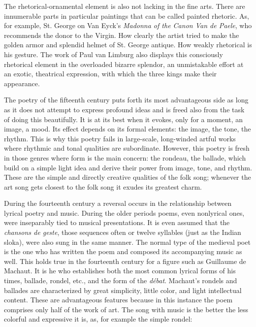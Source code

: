\protect\hypertarget{21_Chapter_Thirteen__IMAGE_AND_WORD.xhtmlux5cux23page_356}{}{}The
rhetorical-ornamental element is also not lacking in the fine arts.
There are innumerable parts in particular paintings that can be called
painted rhetoric. As, for example, St. George on Van Eyck's
\emph{Madonna of the Canon Van de Paele}, who recommends the donor to
the Virgin. How clearly the artist tried to make the golden armor and
splendid helmet of St. George antique. How weakly rhetorical is his
gesture. The work of Paul van Limburg also displays this consciously
rhetorical element in the overloaded bizarre splendor, an unmistakable
effort at an exotic, theatrical expression, with which the three kings
make their appearance.

The poetry of the fifteenth century puts forth its most advantageous
side as long as it does not attempt to express profound ideas and is
freed also from the task of doing this beautifully. It is at its best
when it evokes, only for a moment, an image, a mood. Its effect depends
on its formal elements: the image, the tone, the rhythm. This is why
this poetry fails in large-scale, long-winded artful works where
rhythmic and tonal qualities are subordinate. However, this poetry is
fresh in those genres where form is the main concern: the rondeau, the
ballade, which build on a simple light idea and derive their power from
image, tone, and rhythm. These are the simple and directly creative
qualities of the folk song; whenever the art song gets closest to the
folk song it exudes its greatest charm.

During the fourteenth century a reversal occurs in the relationship
between lyrical poetry and music. During the older periods poems, even
nonlyrical ones, were inseparably tied to musical presentations. It is
even assumed that the \emph{chansons de geste}, those sequences often or
twelve syllables (just as the Indian sloka), were also sung in the same
manner. The normal type of the medieval poet is the one who has written
the poem and composed its accompanying music as well. This holds true in
the fourteenth century for a figure such as Guillaume de Machaut. It is
he who establishes both the most common lyrical forms of his times,
ballade, rondel, etc., and the form of the \emph{débat}. Machaut's
rondels and ballades are characterized by great simplicity, little
color, and light intellectual content. These are advantageous features
because in this instance the poem comprises only half of the work of
art. The song with music is the better the less colorful and expressive
it is, as, for example the simple rondel:

